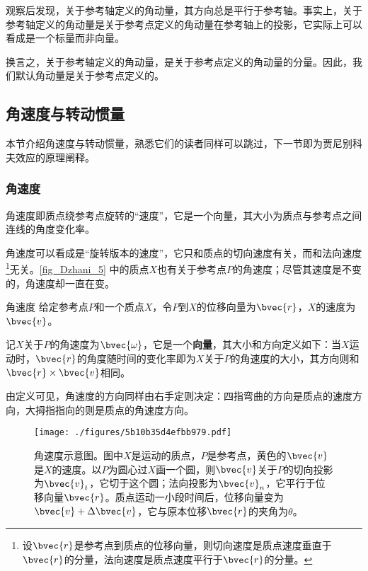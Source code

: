 观察后发现，关于参考轴定义的角动量，其方向总是平行于参考轴。事实上，关于参考轴定义的角动量是关于参考点定义的角动量在参考轴上的投影，它实际上可以看成是一个标量而非向量。


换言之，关于参考轴定义的角动量，是关于参考点定义的角动量的分量。因此，我们默认角动量是关于参考点定义的。






\subsection{角速度与转动惯量}

本节介绍角速度与转动惯量，熟悉它们的读者同样可以跳过，下一节即为贾尼别科夫效应的原理阐释。

\subsubsection{角速度}


角速度即质点绕参考点旋转的“速度”，它是一个向量，其大小为质点与参考点之间连线的角度变化率。

角速度可以看成是“旋转版本的速度”，它只和质点的切向速度有关，而和法向速度\footnote{设$\bvec{r}$是参考点到质点的位移向量，则切向速度是质点速度垂直于$\bvec{r}$的分量，法向速度是质点速度平行于$\bvec{r}$的分量。}无关。\autoref{fig_Dzhani_5} 中的质点$X$也有关于参考点$P$的角速度；尽管其速度是不变的，角速度却一直在变。

\begin{definition}{角速度}\label{def_Dzhani_1}
给定参考点$P$和一个质点$X$，令$P$到$X$的位移向量为$\bvec{r}$，$X$的速度为$\bvec{v}$。

记$X$关于$P$的角速度为$\bvec{\omega}$，它是一个\textbf{向量}，其大小和方向定义如下：当$X$运动时，$\bvec{r}$的角度随时间的变化率即为$X$关于$P$的角速度的大小，其方向则和$\bvec{r}\times \bvec{v}$相同。
\end{definition}

由定义可见，角速度的方向同样由右手定则决定：四指弯曲的方向是质点的速度方向，大拇指指向的则是质点的角速度方向。



\begin{figure}[ht]
\centering
\texttt{[image: ./figures/5b10b35d4efbb979.pdf]}
\caption{角速度示意图。图中$X$是运动的质点，$P$是参考点，黄色的$\bvec{v}$是$X$的速度。以$P$为圆心过$X$画一个圆，则$\bvec{v}$关于$P$的切向投影为$\bvec{v}_t$，它切于这个圆；法向投影为$\bvec{v}_n$，它平行于位移向量$\bvec{r}$。质点运动一小段时间后，位移向量变为$\bvec{v}+\Delta\bvec{v}$，它与原本位移$\bvec{r}$的夹角为$\theta$。} \label{fig_Dzhani_10}
\end{figure}



